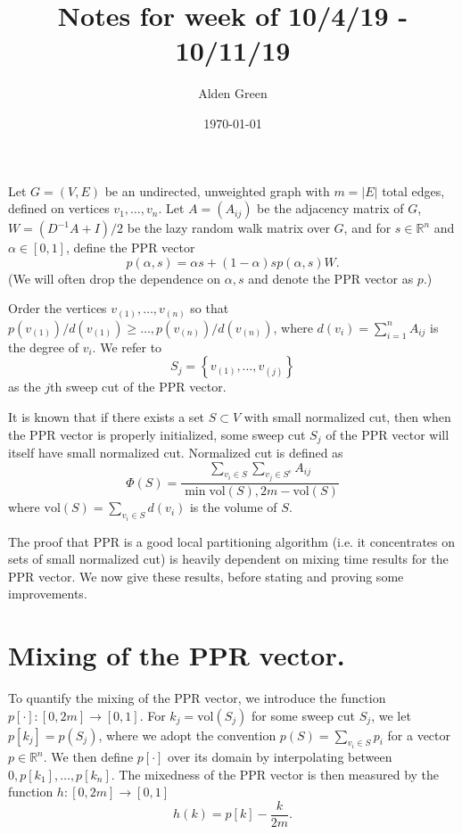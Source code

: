 \documentclass{article}
\newcommand{\Reals}{\mathbb{R}}
\newcommand{\abs}[1]{\left \lvert #1 \right \rvert}
\newcommand{\vol}{\mathrm{vol}}
\newcommand{\set}[1]{\left\{#1\right\}}
\newcommand{\1}{\mathbf{1}}
\theoremstyle{alden}
\theoremstyle{aldenthm}
\theoremstyle{remark}
\begin{document}
	
\title{Notes for week of 10/4/19 - 10/11/19}
\author{Alden Green}
\date{\today}
\maketitle

Let $G = (V,E)$ be an undirected, unweighted graph with $m = \abs{E}$ total edges, defined on vertices $v_1, \ldots, v_n$. Let $A = (A_{ij})$ be the adjacency matrix of $G$, $W = (D^{-1}A + I)/2$ be the lazy random walk matrix over $G$, and for $s \in \Reals^n$ and $\alpha \in [0,1]$, define the PPR vector
\begin{equation*}
p(\alpha,s) = \alpha s + (1 - \alpha) s p(\alpha,s)W.
\end{equation*}
(We will often drop the dependence on $\alpha,s$ and denote the PPR vector as $p$.)

Order the vertices $v_{(1)},\ldots,v_{(n)}$ so that $p(v_{(1)})/d(v_{(1)}) \geq \ldots, p(v_{(n)})/d(v_{(n)})$, where $d(v_i) = \sum_{i = 1}^{n} A_{ij}$ is the degree of $v_i$. We refer to
\begin{equation*}
S_j = \set{v_{(1)},\ldots,v_{(j)}}
\end{equation*}
as the $j$th sweep cut of the PPR vector.

It is known that if there exists a set $S \subset V$ with small normalized cut, then when the PPR vector is properly initialized, some sweep cut $S_j$ of the PPR vector will itself have small normalized cut. Normalized cut is defined as
\begin{equation*}
\Phi(S) = \frac{\sum_{v_i \in S}\sum_{v_j \in S^c} A_{ij}}{\min{\vol(S),2m - \vol(S)}}
\end{equation*}
where $\vol(S) = \sum_{v_i \in S} d(v_i)$ is the volume of $S$.

The proof that PPR is a good local partitioning algorithm (i.e. it concentrates on sets of small normalized cut) is heavily dependent on mixing time results for the PPR vector. We now give these results, before stating and proving some improvements.

\section{Mixing of the PPR vector.}

To quantify the mixing of the PPR vector, we introduce the function $p[\cdot]: [0,2m] \to [0,1]$. For $k_j = \vol(S_j)$ for some sweep cut $S_j$, we let $p[k_j] = p(S_j)$, where we adopt the convention $p(S) = \sum_{v_i \in S} p_i$ for a vector $p \in \Reals^n$. We then define $p[\cdot]$ over its domain by interpolating between $0, p[k_1], \ldots, p[k_n]$. The mixedness of the PPR vector is then measured by the function $h:[0,2m] \to [0,1]$
\begin{equation*}
h(k) = p[k] - \frac{k}{2m}.
\end{equation*}
\end{document}
